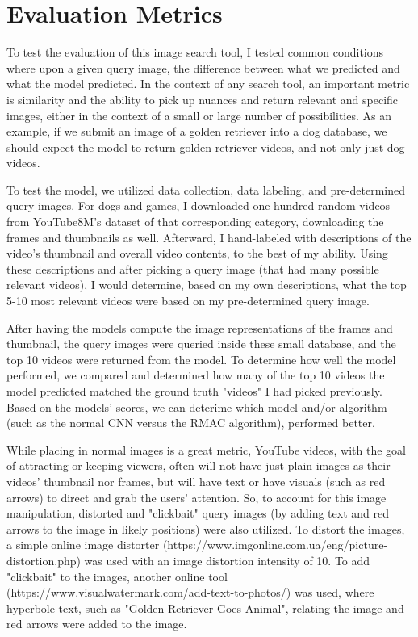 \documentclass[10pt,twocolumn]{article}
\begin{document}
\section{Evaluation Metrics}

To test the evaluation of this image search tool, I tested common conditions where upon a given query image, the difference between what we predicted and what the model predicted. In the context of any search tool, an important metric is similarity and the ability to pick up nuances and return relevant and specific images, either in the context of a small or large number of possibilities. As an example, if we submit an image of a golden retriever into a dog database, we should expect the model to return golden retriever videos, and not only just dog videos.

To test the model, we utilized data collection, data labeling, and pre-determined query images. For dogs and games, I downloaded one hundred random videos from YouTube8M's dataset of that corresponding category, downloading the frames and thumbnails as well. Afterward, I hand-labeled with descriptions of the video's thumbnail and overall video contents, to the best of my ability. Using these descriptions and after picking a query image (that had many possible relevant videos), I would determine, based on my own descriptions, what the top 5-10 most relevant videos were based on my pre-determined query image. 

After having the models compute the image representations of the frames and thumbnail, the query images were queried inside these small database, and the top 10 videos were returned from the model. To determine how well the model performed, we compared and determined how many of the top 10 videos the model predicted matched the ground truth "videos" I had picked previously. Based on the models' scores, we can deterime which model and/or algorithm (such as the normal CNN versus the RMAC algorithm), performed better.

While placing in normal images is a great metric, YouTube videos, with the goal of attracting or keeping viewers, often will not have just plain images as their videos' thumbnail nor frames, but will have text or have visuals (such as red arrows) to direct and grab the users' attention. So, to account for this image manipulation, distorted and "clickbait" query images (by adding text and red arrows to the image in likely positions) were also utilized. To distort the images, a simple online image distorter (https://www.imgonline.com.ua/eng/picture-distortion.php) was used with an image distortion intensity of 10. To add "clickbait" to the images, another online tool (https://www.visualwatermark.com/add-text-to-photos/) was used, where hyperbole text, such as "Golden Retriever Goes Animal", relating the image and red arrows were added to the image.
\end{document}
